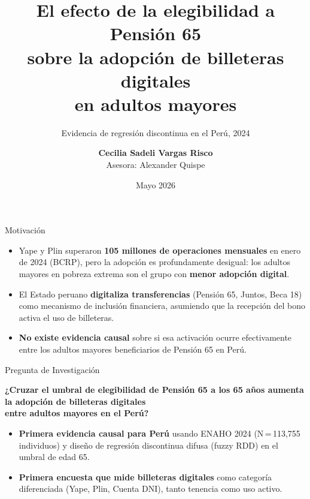 \documentclass[aspectratio=169, 10pt]{beamer}
\title[Pensión 65 y Billeteras Digitales]{%
  El efecto de la elegibilidad a Pensión 65\\
  sobre la adopción de billeteras digitales\\
  en adultos mayores}
\subtitle{Evidencia de regresión discontinua en el Perú, 2024}
\author[Vargas Risco]{%
  \textbf{Cecilia Sadeli Vargas Risco}\\[4pt]
  {\small Asesora: Alexander Quispe}}
\institute[PUCP]{%
  Pontificia Universidad Católica del Perú\\
  Facultad de Ciencias Sociales}
\date{Mayo 2026}
\begin{document}

\begin{frame}
  \titlepage
\end{frame}

\begin{frame}{Motivación}
  \begin{itemize}
    \setlength\itemsep{14pt}
    \item Yape y Plin superaron \textbf{105 millones de operaciones mensuales}
          en enero de 2024 (BCRP), pero la adopción es profundamente desigual:
          los adultos mayores en pobreza extrema son el grupo con
          \textbf{menor adopción digital}.

    \item El Estado peruano \textbf{digitaliza transferencias}
          (Pensión 65, Juntos, Beca 18) como mecanismo de inclusión
          financiera, asumiendo que la recepción del bono activa el uso
          de billeteras.

    \item \textbf{No existe evidencia causal} sobre si esa activación
          ocurre efectivamente entre los adultos mayores beneficiarios de
          Pensión 65 en Perú.
  \end{itemize}
\end{frame}

\begin{frame}{Pregunta de Investigación}
  \vspace{6pt}
  \begin{block}{}
    \centering
    \large
    \textbf{¿Cruzar el umbral de elegibilidad de Pensión 65 a los 65 años
    aumenta la adopción de billeteras digitales\\
    entre adultos mayores en el Perú?}
  \end{block}

  \vspace{14pt}
  \begin{itemize}
    \setlength\itemsep{10pt}
    \item \textbf{Primera evidencia causal para Perú} usando ENAHO 2024
          (N\,=\,113{,}755 individuos) y diseño de regresión
          discontinua difusa (fuzzy RDD) en el umbral de edad 65.

    \item \textbf{Primera encuesta que mide billeteras digitales}
          como categoría diferenciada (Yape, Plin, Cuenta DNI),
          tanto tenencia como uso activo.
  \end{itemize}
\end{frame}
\end{document}
